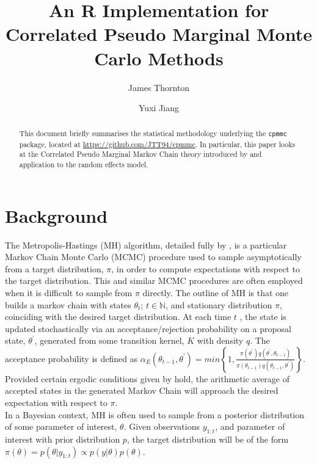 \documentclass{article}
\title{An R Implementation for Correlated Pseudo Marginal Monte Carlo Methods}
\author{James Thornton \and Yuxi Jiang}
\begin{document}



\maketitle

\begin{abstract}
This document briefly summarises the statistical methodology underlying the \texttt{cpmmc} package, located at \url{https://github.com/JTT94/cpmmc}. In particular, this paper looks at the Correlated Pseudo Marginal Markov Chain theory introduced by \cite{cpmmDeligiannidis2015} and application to the random effects model.
\end{abstract}

\section{Background}

The Metropolis-Hastings (MH) algorithm, detailed fully by \cite{roberts2004}, is a particular Markov Chain Monte Carlo (MCMC) procedure used to sample asymptotically from a target distribution, $\pi$, in order to compute expectations with respect to the target distribution. This and similar MCMC procedures are often employed when it is difficult to sample from $\pi$ directly. The outline of MH is that one builds a markov chain with states $ \theta_t $; $ t \in \mathbb{N}$, and stationary distribution $\pi$, coinciding with the desired target distribution. At each time $ t $ , the state is updated stochastically via an acceptance/rejection probability on a proposal state, $\theta^\prime$, generated from some transition kernel, $K$ with density $q$. The acceptance probability is defined as  $ \alpha_E(\theta_{t-1}, \theta^\prime) = min\left\{1,  \frac{
                \pi(\theta^\prime) q(\theta^\prime, \theta_{t-1})}
                {\pi(\theta_{t-1}) q(\theta_{t-1}, \theta^\prime)}
\right\} $. Provided certain ergodic conditions given by \cite{roberts2004} hold, the arithmetic average of accepted states in the generated Markov Chain will approach the desired expectation with respect to $\pi$. \\

In a Bayesian context, MH is often used to sample from a posterior distribution of some parameter of interest, $\theta$. Given observations $y_{1:t}$, and parameter of interest with prior distribution $p$, the target distribution will be of the form $\pi (\theta) = p(\theta | y_{1:t} ) \propto p(y|\theta) p(\theta)$.\\
\end{document}
